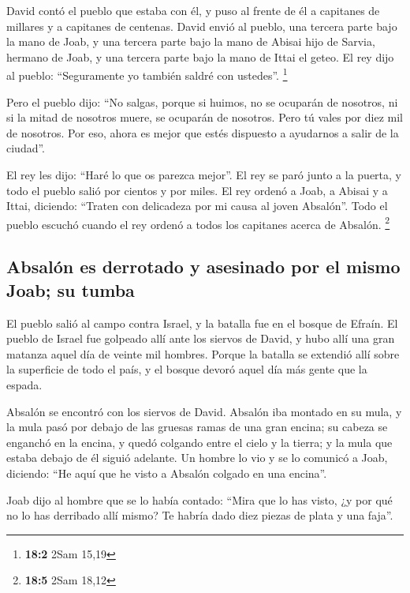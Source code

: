 \begin{paracol}{2}
 David contó el pueblo que estaba con él, y puso al frente
de él a capitanes de millares y a capitanes de centenas. 
David envió al pueblo, una tercera parte bajo la mano de Joab, y una
tercera parte bajo la mano de Abisai hijo de Sarvia, hermano de Joab, y
una tercera parte bajo la mano de Ittai el geteo. El rey dijo al pueblo:
``Seguramente yo también saldré con ustedes''. \footnote{\textbf{18:2}
  2Sam 15,19}

 Pero el pueblo dijo: ``No salgas, porque si huimos, no se
ocuparán de nosotros, ni si la mitad de nosotros muere, se ocuparán de
nosotros. Pero tú vales por diez mil de nosotros. Por eso, ahora es
mejor que estés dispuesto a ayudarnos a salir de la ciudad''.

 El rey les dijo: ``Haré lo que os parezca mejor''. El rey
se paró junto a la puerta, y todo el pueblo salió por cientos y por
miles.  El rey ordenó a Joab, a Abisai y a Ittai,
diciendo: ``Traten con delicadeza por mi causa al joven Absalón''. Todo
el pueblo escuchó cuando el rey ordenó a todos los capitanes acerca de
Absalón. \footnote{\textbf{18:5} 2Sam 18,12}

\hypertarget{absaluxf3n-es-derrotado-y-asesinado-por-el-mismo-joab-su-tumba}{%
\subsection{Absalón es derrotado y asesinado por el mismo Joab; su
tumba}\label{absaluxf3n-es-derrotado-y-asesinado-por-el-mismo-joab-su-tumba}}

 El pueblo salió al campo contra Israel, y la batalla fue
en el bosque de Efraín.  El pueblo de Israel fue golpeado
allí ante los siervos de David, y hubo allí una gran matanza aquel día
de veinte mil hombres.  Porque la batalla se extendió allí
sobre la superficie de todo el país, y el bosque devoró aquel día más
gente que la espada.

 Absalón se encontró con los siervos de David. Absalón iba
montado en su mula, y la mula pasó por debajo de las gruesas ramas de
una gran encina; su cabeza se enganchó en la encina, y quedó colgando
entre el cielo y la tierra; y la mula que estaba debajo de él siguió
adelante.  Un hombre lo vio y se lo comunicó a Joab,
diciendo: ``He aquí que he visto a Absalón colgado en una encina''.

 Joab dijo al hombre que se lo había contado: ``Mira que
lo has visto, ¿y por qué no lo has derribado allí mismo? Te habría dado
diez piezas de plata y una faja''.


\end{paracol}
